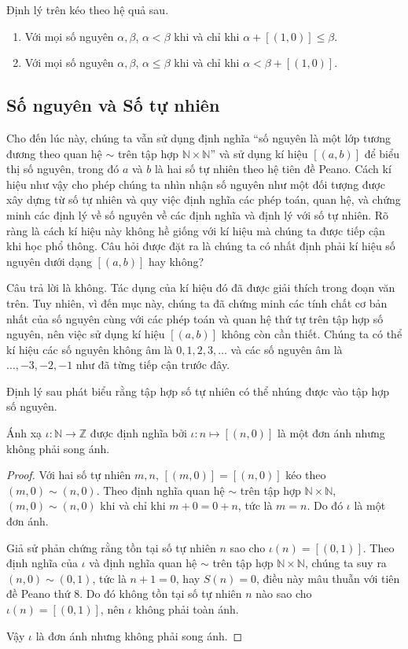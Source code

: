Định lý trên kéo theo hệ quả sau.
\begin{corollary}
	\begin{enumerate}
		\item Với mọi số nguyên $\alpha, \beta$, $\alpha < \beta$ khi và chỉ khi $\alpha + [(1, 0)]\leq \beta$.
		\item Với mọi số nguyên $\alpha, \beta$, $\alpha\leq \beta$ khi và chỉ khi $\alpha < \beta + [(1,0)]$.
	\end{enumerate}
\end{corollary}

\subsection*{Số nguyên và Số tự nhiên}

Cho đến lúc này, chúng ta vẫn sử dụng định nghĩa ``số nguyên là một lớp tương đương theo quan hệ $\sim$ trên tập hợp $\mathbb{N}\times\mathbb{N}$'' và sử dụng kí hiệu $[(a, b)]$ để biểu thị số nguyên, trong đó $a$ và $b$ là hai số tự nhiên theo hệ tiên đề Peano. Cách kí hiệu như vậy cho phép chúng ta nhìn nhận số nguyên như một đối tượng được xây dựng từ số tự nhiên và quy việc định nghĩa các phép toán, quan hệ, và chứng minh các định lý về số nguyên về các định nghĩa và định lý với số tự nhiên. Rõ ràng là cách kí hiệu này không hề giống với kí hiệu mà chúng ta được tiếp cận khi học phổ thông. Câu hỏi được đặt ra là chúng ta có nhất định phải kí hiệu số nguyên dưới dạng $[(a, b)]$ hay không?

Câu trả lời là không. Tác dụng của kí hiệu đó đã được giải thích trong đoạn văn trên. Tuy nhiên, vì đến mục này, chúng ta đã chứng minh các tính chất cơ bản nhất của số nguyên cùng với các phép toán và quan hệ thứ tự trên tập hợp số nguyên, nên việc sử dụng kí hiệu $[(a, b)]$ không còn cần thiết. Chúng ta có thể kí hiệu các số nguyên không âm là $0, 1, 2, 3,\ldots$ và các số nguyên âm là $\ldots, -3, -2, -1$ như đã từng tiếp cận trước đây.

Định lý sau phát biểu rằng tập hợp số tự nhiên có thể nhúng được vào tập hợp số nguyên.
\begin{theorem}\label{theorem:embed-N-into-Z}
	Ánh xạ $\iota: \mathbb{N}\to \mathbb{Z}$ được định nghĩa bởi $\iota: n\mapsto [(n, 0)]$ là một đơn ánh nhưng không phải song ánh.
\end{theorem}

\begin{proof}
	Với hai số tự nhiên $m, n$, $[(m, 0)] = [(n, 0)]$ kéo theo $(m, 0)\sim (n, 0)$. Theo định nghĩa quan hệ $\sim$ trên tập hợp $\mathbb{N}\times\mathbb{N}$, $(m, 0)\sim (n, 0)$ khi và chỉ khi $m + 0 = 0 + n$, tức là $m = n$. Do đó $\iota$ là một đơn ánh.

	Giả sử phản chứng rằng tồn tại số tự nhiên $n$ sao cho $\iota(n) = [(0, 1)]$. Theo định nghĩa của $\iota$ và định nghĩa quan hệ $\sim$ trên tập hợp $\mathbb{N}\times\mathbb{N}$, chúng ta suy ra $(n, 0)\sim (0, 1)$, tức là $n + 1 = 0$, hay $S(n) = 0$, điều này mâu thuẫn với tiên đề Peano thứ 8. Do đó không tồn tại số tự nhiên $n$ nào sao cho $\iota(n) = [(0, 1)]$, nên $\iota$ không phải toàn ánh.

	Vậy $\iota$ là đơn ánh nhưng không phải song ánh.
\end{proof}

